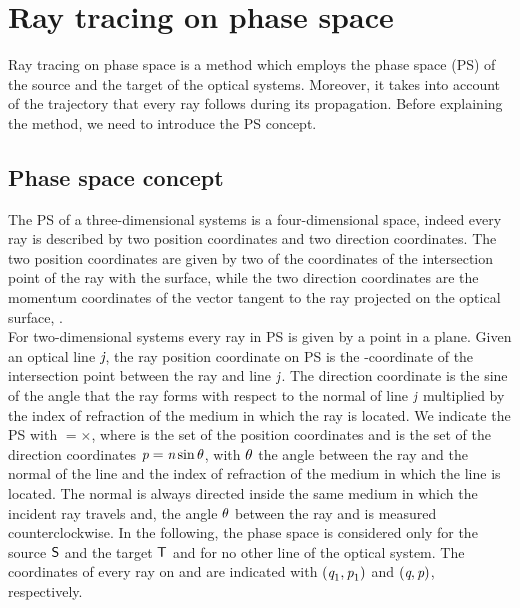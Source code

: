 \chapter{Ray tracing on phase space} \label{chap:PS}
Ray tracing on phase space is a method which employs the phase space (PS) of the source and the target of the optical systems.
Moreover, it takes into account of the trajectory that every ray follows during its propagation.
Before explaining the method, we need to introduce the PS concept.
\section{Phase space concept}
The PS of a three-dimensional systems is a four-dimensional space, indeed every ray is described by two position coordinates
and two direction coordinates.
The two position coordinates are given by two of the coordinates of the intersection point of the ray with the surface, while the two direction coordinates are
the momentum coordinates of the vector tangent to the ray projected on the optical surface, \cite{wolf2004geometric}.
\\ \indent For two-dimensional systems every ray in PS is given by a point in a plane.
Given an optical line $\textit{j}$, the ray position coordinate on PS is the -coordinate of the intersection point between the ray and line $\textit{j}$.
The direction coordinate is the sine of the angle that the ray forms with respect to the normal of line $\textit{j}$ multiplied by the index of refraction of the medium in which the ray is located.
We indicate the PS with $=$$\times$,
where  is the set of the position coordinates  and  is the set of the direction coordinates $\textit{p}=\textit{n}\sin{\theta}$, with $\theta$ the angle between the ray and the normal \vect{$\boldsymbol{\nu}$} of the line and  the index of refraction of the medium in which the line is located.
The normal \vect{$\boldsymbol{\nu}$} is always directed inside the same medium in which the incident ray travels and,
the angle $\theta$ between the ray and \vect{$\boldsymbol{\nu}$} is measured counterclockwise.
In the following, the phase space is considered only for the source $\textsf{S}$ and the target $\textsf{T}$ and for no other line of the optical system.
The coordinates of every ray on  and  are indicated with $(\textit{q}_1,\textit{p}_1)$ and $(\textit{q},\textit{p})$, respectively.\\ \indent
